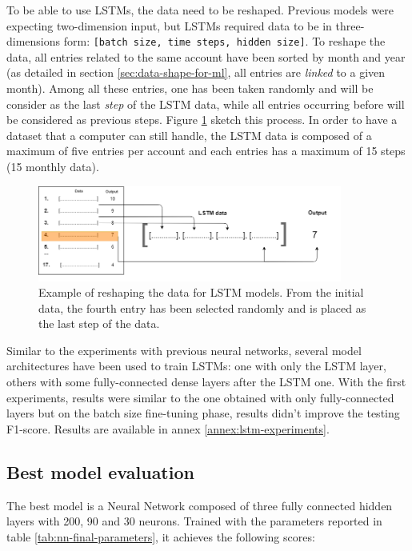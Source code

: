 To be able to use LSTMs, the data need to be reshaped. Previous models were expecting two-dimension input, but LSTMs required data to be in three-dimensions form: \texttt{[batch size, time steps, hidden size]}. To reshape the data, all entries related to the same account have been sorted by month and year (as detailed in section \ref{sec:data-shape-for-ml}, all entries are \textit{linked} to a given month). Among all these entries, one has been taken randomly and will be consider as the last \textit{step} of the LSTM data, while all entries occurring before will be considered as previous steps. Figure \ref{fig:lst-data-build} sketch this process. In order to have a dataset that a computer can still handle, the LSTM data is composed of a maximum of five entries per account and each entries has a maximum of 15 steps (15 monthly data).

\begin{figure}[!htbp]
    \centering
    \includegraphics[width=10cm]{images/lstm-data-build.png}
    \caption[LSTM data build]{Example of reshaping the data for LSTM models. From the initial data, the fourth entry has been selected randomly and is placed as the last step of the data.}
    \label{fig:lst-data-build}
\end{figure}

Similar to the experiments with previous neural networks, several model architectures have been used to train LSTMs: one with only the LSTM layer, others with some fully-connected dense layers after the LSTM one. With the first experiments, results were similar to the one obtained with only fully-connected layers but on the batch size fine-tuning phase, results didn't improve the testing F1-score. Results are available in annex \ref{annex:lstm-experiments}.



\subsection{Best model evaluation}
\label{sec:best-model}

The best model is a Neural Network composed of three fully connected hidden layers with 200, 90 and 30 neurons. Trained with the parameters reported in table \ref{tab:nn-final-parameters}, it achieves the following scores:

